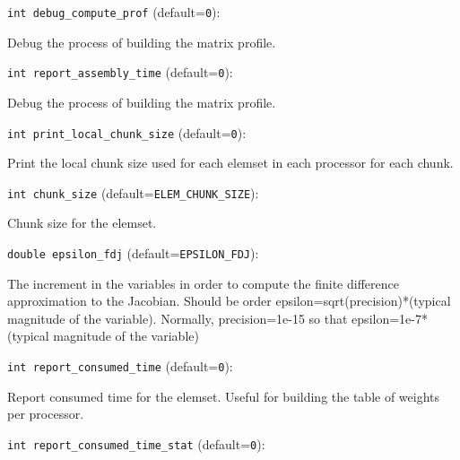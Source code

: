 \item\verb+int debug_compute_prof+ {\rm(default=\verb|0|)}:

Debug the process of building the matrix profile. 

\item\verb+int report_assembly_time+ {\rm(default=\verb|0|)}:

Debug the process of building the matrix profile. 

\item\verb+int print_local_chunk_size+ {\rm(default=\verb|0|)}:

Print the local chunk size used for each elemset in each
processor for each chunk. 

\item\verb+int chunk_size+ {\rm(default=\verb|ELEM_CHUNK_SIZE|)}:

Chunk size for the elemset. 

\item\verb+double epsilon_fdj+ {\rm(default=\verb|EPSILON_FDJ|)}:

The increment in the variables in order to
compute the finite difference approximation to the
Jacobian. Should be order epsilon=sqrt(precision)*(typical
magnitude of the variable). Normally, precision=1e-15 so
that epsilon=1e-7*(typical magnitude of the
variable)

\item\verb+int report_consumed_time+ {\rm(default=\verb|0|)}:

Report consumed time for the elemset. Useful for building
the table of weights per processor. 

\item\verb+int report_consumed_time_stat+ {\rm(default=\verb|0|)}:

